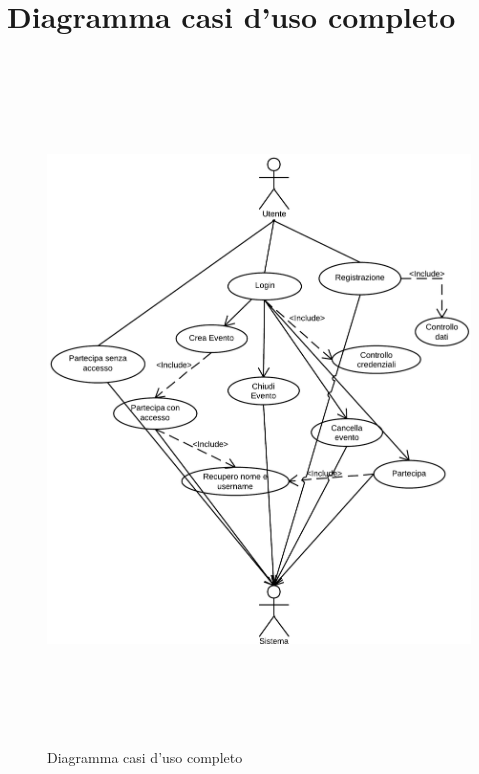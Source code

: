 \section{Diagramma casi d'uso completo}
\begin{figure}[h]
\flushleft
\includegraphics[width=16cm, height=18.2cm]{img/use/Diagcompletovert1.png}
\caption{Diagramma casi d'uso completo}
\label{fig:diagcompl}
\end{figure}

